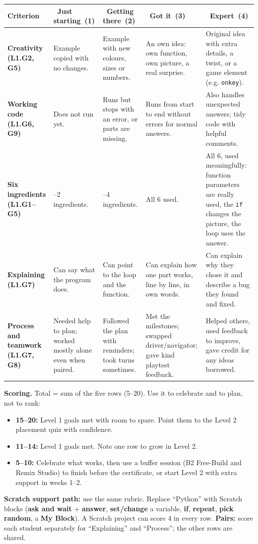 \documentclass[level=1,teacher]{kidscode}
\newcommand{\lvA}{\faSeedling\ Just starting}
\newcommand{\lvB}{\faShoePrints\ Getting there}
\newcommand{\lvC}{\faCheckCircle\ Got it}
\newcommand{\lvD}{\faRocket\ Expert}
\begin{document}
{\small\renewcommand{\arraystretch}{1.3}
\begin{longtable}{@{}>{\bfseries\RaggedRight}p{2.3cm}*{4}{>{\RaggedRight\arraybackslash}p{}}@{}}
\toprule
Criterion & \lvA\ (1) & \lvB\ (2) & \lvC\ (3) & \lvD\ (4)\\
\midrule\endhead
\bottomrule\endfoot
Creativity (L1.G2, G5) & Example copied with no changes. & Example with new colours, sizes or numbers. & An own idea: own function, own picture, a real surprise. & Original idea with extra details, a twist, or a game element (e.g. \texttt{onkey}).\\
\midrule
Working code (L1.G6, G9) & Does not run yet. & Runs but stops with an error, or parts are missing. & Runs from start to end without errors for normal answers. & Also handles unexpected answers; tidy code with helpful comments.\\
\midrule
Six ingredients (L1.G1--G5) & 1--2 ingredients. & 3--4 ingredients. & All 6 used. & All 6, used meaningfully: function parameters are really used, the \texttt{if} changes the picture, the loop uses the answer.\\
\midrule
Explaining (L1.G7) & Can say what the program does. & Can point to the loop and the function. & Can explain how one part works, line by line, in own words. & Can explain why they chose it and describe a bug they found and fixed.\\
\midrule
Process and teamwork (L1.G7, G8) & Needed help to plan; worked mostly alone even when paired. & Followed the plan with reminders; took turns sometimes. & Met the milestones; swapped driver/navigator; gave kind playtest feedback. & Helped others, used feedback to improve, gave credit for any ideas borrowed.\\
\end{longtable}}

\textbf{Scoring.} Total = sum of the five rows (5--20). Use it to celebrate and to plan, not to rank:
\begin{itemize}[itemsep=1pt]
  \item \textbf{15--20:} Level 1 goals met with room to spare. Point them to the Level 2 placement quiz with confidence.
  \item \textbf{11--14:} Level 1 goals met. Note one row to grow in Level 2.
  \item \textbf{5--10:} Celebrate what works, then use a buffer session (B2 Free-Build and Remix Studio) to finish before the certificate, or start Level 2 with extra support in weeks 1--2.
\end{itemize}
\textbf{Scratch support path:} use the same rubric. Replace \enquote{Python} with Scratch blocks
(\textbf{ask and wait} + \textbf{answer}, \textbf{set/change} a variable, \textbf{if}, \textbf{repeat},
\textbf{pick random}, a \textbf{My Block}). A Scratch project can score 4 in every row.
\textbf{Pairs:} score each student separately for \enquote{Explaining} and \enquote{Process}; the other rows
are shared.
\end{document}
